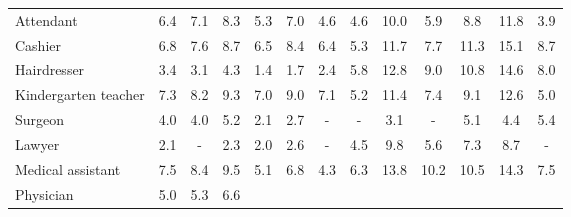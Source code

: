 \begin{table*}[p]
{\begin{tabular}{l|ccc|ccc|ccc|ccc}
Attendant
& \cellcolor{orange2} 6.4 & \cellcolor{orange3} 7.1 & \cellcolor{orange3} 8.3
& \cellcolor{orange2} 5.3 & \cellcolor{orange3} 7.0 & \cellcolor{orange2} 4.6
& \cellcolor{orange2} 4.6 & \cellcolor{orange4} 10.0 & \cellcolor{orange2} 5.9
& \cellcolor{orange3} 8.8 & \cellcolor{orange4} 11.8 & \cellcolor{orange2} 3.9
\\
Cashier
& \cellcolor{orange3} 6.8 & \cellcolor{orange3} 7.6 & \cellcolor{orange3} 8.7
& \cellcolor{orange2} 6.5 & \cellcolor{orange3} 8.4 & \cellcolor{orange2} 6.4
& \cellcolor{orange2} 5.3 & \cellcolor{orange4} 11.7 & \cellcolor{orange3} 7.7
& \cellcolor{orange4} 11.3 & \cellcolor{orange6} 15.1 & \cellcolor{orange3} 8.7
\\
Hairdresser
& \cellcolor{orange1} 3.4 & \cellcolor{orange1} 3.1 & \cellcolor{orange2} 4.3
& \cellcolor{orange1} 1.4 & \cellcolor{orange1} 1.7 & \cellcolor{blue1} 2.4
& \cellcolor{orange2} 5.8 & \cellcolor{orange5} 12.8 & \cellcolor{orange3} 9.0
& \cellcolor{orange4} 10.8 & \cellcolor{orange6} 14.6 & \cellcolor{orange3} 8.0
\\
Kindergarten teacher
& \cellcolor{orange3} 7.3 & \cellcolor{orange3} 8.2 & \cellcolor{orange4} 9.3
& \cellcolor{orange3} 7.0 & \cellcolor{orange3} 9.0 & \cellcolor{orange3} 7.1
& \cellcolor{orange2} 5.2 & \cellcolor{orange4} 11.4 & \cellcolor{orange3} 7.4
& \cellcolor{orange3} 9.1 & \cellcolor{orange5} 12.6 & \cellcolor{orange2} 5.0
\\
Surgeon
& \cellcolor{orange2} 4.0 & \cellcolor{orange2} 4.0 & \cellcolor{orange2} 5.2
& \cellcolor{orange1} 2.1 & \cellcolor{orange1} 2.7 & \cellcolor{lightgray} -
& \cellcolor{lightgray} - & \cellcolor{orange1} 3.1 & \cellcolor{lightgray} -
& \cellcolor{orange2} 5.1 & \cellcolor{orange2} 4.4 & \cellcolor{blue2} 5.4
\\
Lawyer
& \cellcolor{orange1} 2.1 & \cellcolor{lightgray} - & \cellcolor{orange1} 2.3
& \cellcolor{orange1} 2.0 & \cellcolor{orange1} 2.6 & \cellcolor{lightgray} -
& \cellcolor{orange2} 4.5 & \cellcolor{orange4} 9.8 & \cellcolor{orange2} 5.6
& \cellcolor{orange3} 7.3 & \cellcolor{orange3} 8.7 & \cellcolor{lightgray} -
\\
Medical assistant
& \cellcolor{orange3} 7.5 & \cellcolor{orange3} 8.4 & \cellcolor{orange4} 9.5
& \cellcolor{orange2} 5.1 & \cellcolor{orange3} 6.8 & \cellcolor{orange2} 4.3
& \cellcolor{orange2} 6.3 & \cellcolor{orange5} 13.8 & \cellcolor{orange4} 10.2
& \cellcolor{orange4} 10.5 & \cellcolor{orange5} 14.3 & \cellcolor{orange3} 7.5
\\
Physician
& \cellcolor{orange2} 5.0 & \cellcolor{orange2} 5.3 & \cellcolor{orange3} 6.6

\end{tabular}}
\end{table*}
